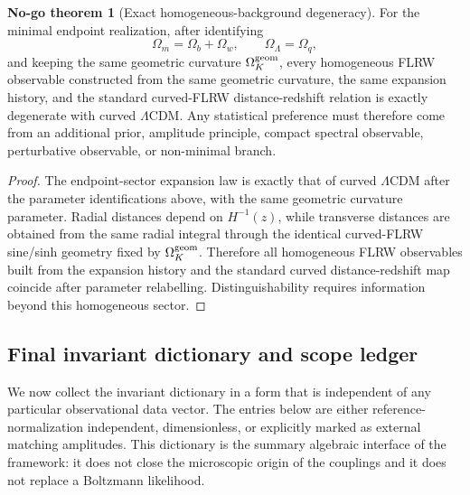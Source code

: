 \documentclass[11pt,a4paper]{article}
\numberwithin{equation}{section}
\theoremstyle{definition}
\newtheorem{nogotheorem}[criterion]{No-go theorem}
\theoremstyle{plain}
\theoremstyle{remark}
\begin{document}
\begin{nogotheorem}[Exact homogeneous-background degeneracy]
For the minimal endpoint realization, after identifying
\begin{equation}
\Omega_m=\Omega_b+\Omega_w,
\qquad
\Omega_\Lambda=\Omega_q,
\end{equation}
and keeping the same geometric curvature \(\Omega_K^{\rm geom}\), every homogeneous FLRW observable constructed from the same geometric curvature, the same expansion history, and the standard curved-FLRW distance-redshift relation is exactly degenerate with curved \(\Lambda\)CDM. Any statistical preference must therefore come from an additional prior, amplitude principle, compact spectral observable, perturbative observable, or non-minimal branch.
\end{nogotheorem}
\begin{proof}
The endpoint-sector expansion law is exactly that of curved \(\Lambda\)CDM after the parameter identifications above, with the same geometric curvature parameter. Radial distances depend on \(H^{-1}(z)\), while transverse distances are obtained from the same radial integral through the identical curved-FLRW sine/sinh geometry fixed by \(\Omega_K^{\rm geom}\). Therefore all homogeneous FLRW observables built from the expansion history and the standard curved distance-redshift map coincide after parameter relabelling. Distinguishability requires information beyond this homogeneous sector.
\end{proof}


\subsection{Final invariant dictionary and scope ledger}
\label{sec:final-invariant-dictionary}

We now collect the invariant dictionary in a form that is independent of any
particular observational data vector.  The entries below are either
reference-normalization independent, dimensionless, or explicitly marked as
external matching amplitudes.  This dictionary is the summary algebraic
interface of the framework: it does not close the microscopic origin of the
couplings and it does not replace a Boltzmann likelihood.
\end{document}
